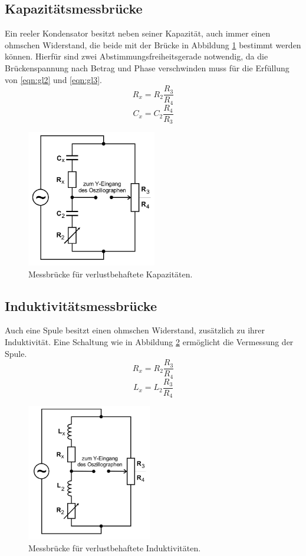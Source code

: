 \subsection{Kapazitätsmessbrücke}
\label{sec:Theorie2}
Ein reeler Kondensator besitzt neben seiner Kapazität, auch immer einen ohmschen Widerstand, die beide mit der Brücke in Abbildung \ref{fig:Schaltung3} bestimmt werden können.
Hierfür sind zwei Abstimmungsfreiheitsgerade notwendig, da die Brückenspannung nach Betrag und Phase verschwinden muss für die Erfüllung von \eqref{eqn:gl2} und \eqref{eqn:gl3}.
\begin{equation}
  R_x = R_2 \frac{R_3}{R_4}
  \label{eqn:gl5}
\end{equation}
\begin{equation}
  C_x = C_2 \frac{R_4}{R_3}
  \label{eqn:gl6}
\end{equation}
\begin{figure}
  \includegraphics[height=6cm]{data/Schaltung3.jpg}
  \centering
  \caption{Messbrücke für verlustbehaftete Kapazitäten.}
  \label{fig:Schaltung3}
\end{figure}
\FloatBarrier

\subsection{Induktivitätsmessbrücke}
\label{sec:Theorei3}
Auch eine Spule besitzt einen ohmschen Widerstand, zusätzlich zu ihrer Induktivität.
Eine Schaltung wie in Abbildung \ref{fig:Schaltung4} ermöglicht die Vermessung der Spule.
\begin{equation}
  R_x = R_2 \frac{R_3}{R_4}
  \label{eqn:gl7}
\end{equation}
\begin{equation}
  L_x = L_2 \frac{R_3}{R_4}
  \label{eqn:gl8}
\end{equation}
\begin{figure}
  \includegraphics[height=6cm]{data/Schaltung4.jpg}
  \centering
  \caption{Messbrücke für verlustbehaftete Induktivitäten.}
  \label{fig:Schaltung4}
\end{figure}
\FloatBarrier


